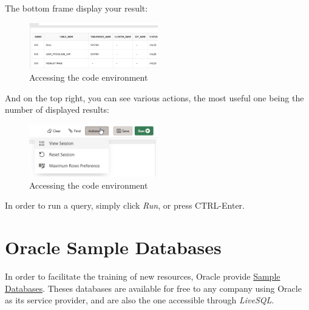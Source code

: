 \documentclass[12pt, letterpaper]{report}
\begin{document}
The bottom frame display your result:

\begin{figure}[H]
	\centering
	\includegraphics[width=0.5\textwidth]{livesql_output}
	\caption{Accessing the code environment}
\end{figure}

And on the top right, you can see various actions, the most useful one being the number of displayed results:

\begin{figure}[H]
	\centering
	\includegraphics[width=0.5\textwidth]{livesql_actions}
	\caption{Accessing the code environment}
\end{figure}

In order to run a query, simply click \textit{Run}, or press CTRL-Enter.

\section{Oracle Sample Databases}

In order to facilitate the training of new resources, Oracle provide \href{https://docs.oracle.com/database/121/COMSC/overview.htm#COMSC005}{Sample Databases}.
Theses databases are available for free to any company using Oracle as its service provider, and are also the one accessible through \textit{LiveSQL}.
\end{document}
